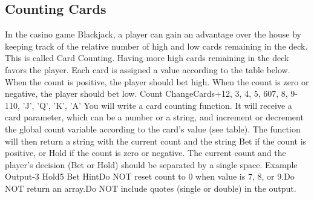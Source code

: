 \documentclass{article}%
\begin{document}
%
\subsection{Counting Cards}%
\label{subsec:CountingCards}%
In the casino game Blackjack, a player can gain an advantage over the house by keeping track of the relative number of high and low cards remaining in the deck. This is called Card Counting.\newline%
Having more high cards remaining in the deck favors the player. Each card is assigned a value according to the table below. When the count is positive, the player should bet high. When the count is zero or negative, the player should bet low.\newline%
Count ChangeCards+12, 3, 4, 5, 607, 8, 9{-}110, 'J', 'Q', 'K', 'A'\newline%
You will write a card counting function. It will receive a card parameter, which can be a number or a string, and increment or decrement the global count variable according to the card's value (see table). The function will then return a string with the current count and the string Bet if the count is positive, or Hold if the count is zero or negative. The current count and the player's decision (Bet or Hold) should be separated by a single space.\newline%
Example Output{-}3 Hold5 Bet\newline%
HintDo NOT reset count to 0 when value is 7, 8, or 9.Do NOT return an array.Do NOT include quotes (single or double) in the output.\newline%

%
\end{document}
